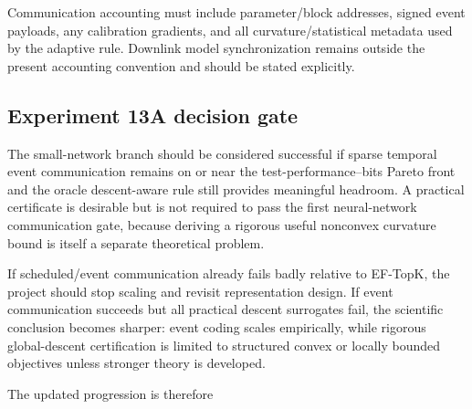 Communication accounting must include parameter/block addresses, signed event payloads, any calibration gradients, and all curvature/statistical metadata used by the adaptive rule. Downlink model synchronization remains outside the present accounting convention and should be stated explicitly.

\subsection{Experiment 13A decision gate}

The small-network branch should be considered successful if sparse temporal event communication remains on or near the test-performance--bits Pareto front and the oracle descent-aware rule still provides meaningful headroom. A practical certificate is desirable but is not required to pass the first neural-network communication gate, because deriving a rigorous useful nonconvex curvature bound is itself a separate theoretical problem.

If scheduled/event communication already fails badly relative to EF-TopK, the project should stop scaling and revisit representation design. If event communication succeeds but all practical descent surrogates fail, the scientific conclusion becomes sharper: event coding scales empirically, while rigorous global-descent certification is limited to structured convex or locally bounded objectives unless stronger theory is developed.

The updated progression is therefore
\begin{center}
\end{center}
